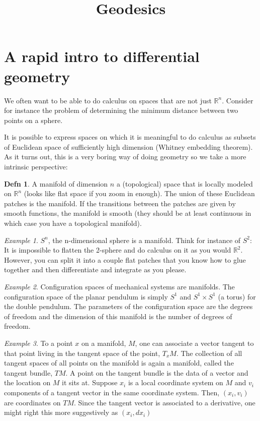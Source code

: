 \documentclass{article}
\title{Geodesics}
\theoremstyle{definition}
\newtheorem*{definition}{Defn}
\theoremstyle{remark}
\theoremstyle{remark}
\newtheorem*{example}{Example}
\begin{document}
\maketitle

\section{A rapid intro to differential geometry}

We often want to be able to do calculus on spaces that are not just $\mathbb{R}^n$. Consider for instance the problem of determining the minimum distance between two points on a sphere. 

It is possible to express spaces on which it is meaningful to do calculus as subsets of Euclidean space of sufficiently high dimension (Whitney embedding theorem). As it turns out, this is a very boring way of doing geometry so we take a more intrinsic perspective:

\begin{definition}
  A manifold of dimension $n$ a (topological) space that is locally modeled on $\mathbb R^n$ (looks like flat space if you zoom in enough). The union of these Euclidean patches is the manifold. If the transitions between the patches are given by smooth functions, the manifold is smooth (they should be at least continuous in which case you have a topological manifold).
\end{definition}

\begin{example}
$S^n$, the n-dimensional sphere is a manifold. Think for instance of $S^2$: It is impossible to flatten the 2-sphere and do calculus on it as you would $\mathbb R^2$. However, you can split it into a couple flat patches that you know how to glue together and then differentiate and integrate as you please.
\end{example}

\begin{example}
  Configuration spaces of mechanical systems are manifolds. The configuration space of the planar pendulum is simply $S^1$ and $S^1\times S^1$ (a torus) for the double pendulum. The parameters of the configuration space are the degrees of freedom and the dimension of this manifold is the number of degrees of freedom.
\end{example}

\begin{example}
  To a point $x$ on a manifold, $M$, one can associate a vector tangent to that point living in the tangent space of the point, $T_xM$. The collection of all tangent spaces of all points on the manifold is again a manifold, called the tangent bundle, $TM$. A point on the tangent bundle is the data of a vector and the location on $M$ it sits at. Suppose $x_i$ is a local coordinate system on $M$ and $v_i$ components of a tangent vector in the same coordinate system. Then, $(x_i, v_i)$ are coordinates on $TM$. Since the tangent vector is associated to a derivative, one might right this more suggestively as $(x_i, dx_i)$ 
\end{example}
\end{document}
